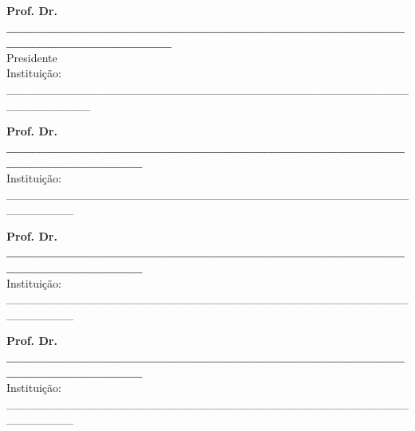 \documentclass[
	12pt,				%
	oneside,			%
	a4paper,			%
	english,			%
	brazil				%
	]{abntex2ppgsi}
\begin{document}
\begin{folhadeaprovacao}
\begin{center}
%
% 
% 
%
% 
% 
% 
%
%
\textbf{Prof. Dr. \_\_\_\_\_\_\_\_\_\_\_\_\_\_\_\_\_\_\_\_\_\_\_\_\_\_\_\_\_\_\_\_\_\_\_\_\_\_\_\_\_\_\_\_\_\_\_\_\_\_\_\_\_\_\_\_\_\_} 
\\ Presidente 
\\ \vspace*{0.1cm} 
Instituição: \_\_\_\_\_\_\_\_\_\_\_\_\_\_\_\_\_\_\_\_\_\_\_\_\_\_\_\_\_\_\_\_\_\_\_\_\_\_\_\_\_\_\_\_\_\_\_\_\_\_\_\_\_\_\_\_\_\_ 

\vspace*{2cm}

\textbf{Prof. Dr. \_\_\_\_\_\_\_\_\_\_\_\_\_\_\_\_\_\_\_\_\_\_\_\_\_\_\_\_\_\_\_\_\_\_\_\_\_\_\_\_\_\_\_\_\_\_\_\_\_\_\_\_\_\_\_} 
\\ \vspace*{0.2cm} 
Instituição: \_\_\_\_\_\_\_\_\_\_\_\_\_\_\_\_\_\_\_\_\_\_\_\_\_\_\_\_\_\_\_\_\_\_\_\_\_\_\_\_\_\_\_\_\_\_\_\_\_\_\_\_\_\_\_\_

\vspace*{2cm}

\textbf{Prof. Dr. \_\_\_\_\_\_\_\_\_\_\_\_\_\_\_\_\_\_\_\_\_\_\_\_\_\_\_\_\_\_\_\_\_\_\_\_\_\_\_\_\_\_\_\_\_\_\_\_\_\_\_\_\_\_\_} 
\\ \vspace*{0.2cm} 
Instituição: \_\_\_\_\_\_\_\_\_\_\_\_\_\_\_\_\_\_\_\_\_\_\_\_\_\_\_\_\_\_\_\_\_\_\_\_\_\_\_\_\_\_\_\_\_\_\_\_\_\_\_\_\_\_\_\_

\vspace*{2cm}

\textbf{Prof. Dr. \_\_\_\_\_\_\_\_\_\_\_\_\_\_\_\_\_\_\_\_\_\_\_\_\_\_\_\_\_\_\_\_\_\_\_\_\_\_\_\_\_\_\_\_\_\_\_\_\_\_\_\_\_\_\_} 
\\ \vspace*{0.2cm} 
Instituição: \_\_\_\_\_\_\_\_\_\_\_\_\_\_\_\_\_\_\_\_\_\_\_\_\_\_\_\_\_\_\_\_\_\_\_\_\_\_\_\_\_\_\_\_\_\_\_\_\_\_\_\_\_\_\_\_

\end{center}
  
\end{folhadeaprovacao}
\end{document}
